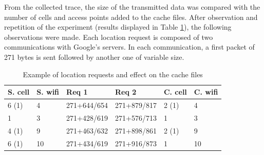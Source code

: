 From the collected trace, the size of the transmitted data was compared with the number of cells and access points added to the cache files.
After observation and repetition of the experiment (results displayed in Table \ref{tab:expe-req-pattern}), the following observations were made.
Each location request is composed of two communications with Google's servers.
In each communication, a first packet of 271 bytes is sent followed by another one of variable size.\\


\begin{table}[h]
  \centering
  \begin{tabular}[h]{ |l|l|l|l|l|l|}
    \hline
    S. cell & S. wifi & Req 1 & Req 2 & C. cell & C. wifi \\
    \hline
    6 (1)    &     4 & 271+644/654 & 271+879/817 & 2 (1) & 4 \\
    \hline
    1       &   3  & 271+428/619 & 271+576/713 & 1 & 3 \\
    \hline
    4 (1) & 9 & 271+463/632 & 271+898/861 & 2 (1) & 9 \\
    \hline
    6 (1) & 10 & 271+434/619 & 271+916/873 & 1 & 10 \\
    \hline
  \end{tabular}
  \caption{Example of location requests and effect on the cache files}
  \label{tab:expe-req-pattern}
\end{table}

